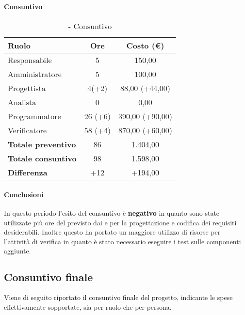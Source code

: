 \documentclass[./PianoDiProgetto.tex]{subfiles}
\begin{document}
\subsubsection{\PerV}

\paragraph{Consuntivo}
\begin{table}[H]
		\centering

		\begin{tabular}{l * {2}{c}}
			\toprule
			\textbf{Ruolo} & \textbf{Ore} & \textbf{Costo (\euro{})} \\
			\midrule
			Responsabile & 5 & 150,00 \\
			Amministratore  & 5 & 100,00 \\
			Progettista  & 4(+2) & 88,00 (+44,00) \\
			Analista & 0 & 0,00 \\
			Programmatore  & 26 (+6) &  390,00 (+90,00) \\
			Verificatore  & 58 (+4)  &  870,00 (+60,00)  \\
			\midrule
			\textbf{Totale preventivo}  & 86   &  1.404,00\\
			\textbf{Totale consuntivo}  & 98   &  1.598,00 \\
			\midrule
			\textbf{Differenza}  & +12  &  +194,00 \\
			\bottomrule
		\end{tabular}
		\caption{\PerV{} - Consuntivo}
	\end{table}
\paragraph{Conclusioni}	
In questo periodo l'esito del consuntivo è \textbf{negativo} in quanto sono state utilizzate più ore del previsto dai \PJP{} e \PRP{} per la progettazione e codifica dei requisiti desiderabili. Inoltre questo ha portato un maggiore utilizzo di risorse per l'attività di verifica in quanto è stato necessario eseguire i test sulle componenti aggiunte.
\clearpage

\subsection{Consuntivo finale}
Viene di seguito riportato il consuntivo finale del progetto, indicante le spese effettivamente sopportate, sia per ruolo che per persona.
\end{document}
